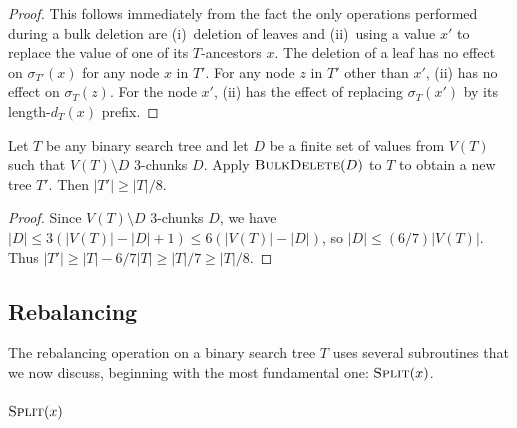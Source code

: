 \documentclass[kpfonts]{patmorin}
\let\le\leqslant
\let\ge\geqslant
\let\geq\geqslant
\begin{document}
\begin{proof}
  This follows immediately from the fact the only operations performed during a bulk deletion are (i)~deletion of leaves and (ii)~using a value $x'$ to replace the value of one of its $T$-ancestors $x$.  The deletion of a leaf has no effect on $\sigma_{T'}(x)$ for any node $x$ in $T'$.  For any node $z$ in $T'$ other than $x'$, (ii) has no effect on $\sigma_T(z)$.  For the node $x'$, (ii) has the effect of replacing $\sigma_T(x')$ by its length-$d_T(x)$ prefix.
\end{proof}

\begin{lem}
  Let $T$ be any binary search tree and let $D$ be a finite set of values from $V(T)$ such that $V(T)\setminus D$ $3$-chunks $D$.
  Apply $\textsc{BulkDelete}(D)$ to $T$ to obtain a new tree $T'$.
  Then $|T'|\ge |T|/8$.
\end{lem}

\begin{proof}
   Since $V(T)\setminus D$ $3$-chunks $D$, we have $|D|\le 3(|V(T)|-|D| + 1) \le 6(|V(T)|-|D|)$, so $|D|\le (6/7)|V(T)|$. Thus $|T'| \ge |T| - 6/7|T| \geq |T|/7 \geq |T|/8$.
\end{proof}

\subsection{Rebalancing}

The rebalancing operation on a binary search tree $T$ uses several subroutines that we now discuss, beginning with the most fundamental one:  $\textsc{Split}(x)$.

\subsubsection{$\textsc{Split}(x)$}
\end{document}
